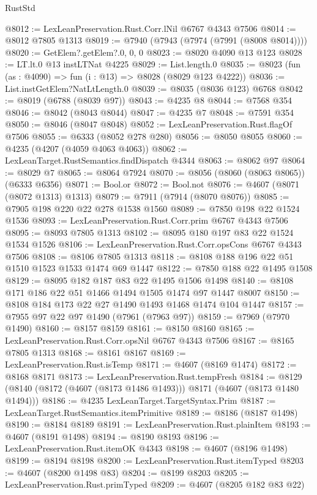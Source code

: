 \begin{lexlean}{RustStd}
\begin{coremodule}
@8012 := LexLeanPreservation.Rust.Corr.lNil @6767 @4343 @7506
@8014 := @8012 @7805 @1313
@8019 := @7940 (@7943 (@7974 (@7991 (@8008 @8014))))
@8020 := GetElem?.getElem?.{0, 0, 0}
@8023 := @8020 @4090 @13 @123
@8028 := LT.lt.{0} @13 instLTNat @4225
@8029 := List.length.{0}
@8035 := @8023 (fun (as : @4090) => fun (i : @13) => @8028 (@8029 @123 @4222))
@8036 := List.instGetElem?NatLtLength.{0}
@8039 := @8035 (@8036 @123) @6768
@8042 := @8019 (@6788 (@8039 @97))
@8043 := @4235 @8
@8044 := @7568 @354
@8046 := @8042 (@8043 @8044)
@8047 := @4235 @7
@8048 := @7591 @354
@8050 := @8046 (@8047 @8048)
@8052 := LexLeanPreservation.Rust.flagOf @7506
@8055 := @6333 (@8052 @278 @280)
@8056 := @8050 @8055
@8060 := @4235 (@4207 (@4059 @4063 @4063))
@8062 := LexLeanTarget.RustSemantics.findDispatch @4344
@8063 := @8062 @97
@8064 := @8029 @7
@8065 := @8064 @7924
@8070 := @8056 (@8060 (@8063 @8065)) (@6333 @6356)
@8071 := Bool.or
@8072 := Bool.not
@8076 := @4607 (@8071 (@8072 @1313) @1313)
@8079 := @7911 (@7914 (@8070 @8076))
@8085 := @7905 @198 @220 @22 @278 @1538 @1560
@8089 := @7850 @198 @22 @1524 @1536
@8093 := LexLeanPreservation.Rust.Corr.prim @6767 @4343 @7506
@8095 := @8093 @7805 @1313
@8102 := @8095 @180 @197 @83 @22 @1524 @1534 @1526
@8106 := LexLeanPreservation.Rust.Corr.opsCons @6767 @4343 @7506
@8108 := @8106 @7805 @1313
@8118 := @8108 @188 @196 @22 @51 @1510 @1523 @1533 @1474 @69 @1447
@8122 := @7850 @188 @22 @1495 @1508
@8129 := @8095 @182 @187 @83 @22 @1495 @1506 @1498
@8140 := @8108 @171 @186 @22 @51 @1466 @1494 @1505 @1474 @97 @1447 @8007
@8150 := @8108 @184 @173 @22 @27 @1490 @1493 @1468 @1474 @104 @1447
@8157 := @7955 @97 @22 @97 @1490 (@7961 (@7963 @97))
@8159 := @7969 (@7970 @1490)
@8160 := @8157 @8159
@8161 := @8150 @8160
@8165 := LexLeanPreservation.Rust.Corr.opsNil @6767 @4343 @7506
@8167 := @8165 @7805 @1313
@8168 := @8161 @8167
@8169 := LexLeanPreservation.Rust.isTemp
@8171 := @4607 (@8169 @1474)
@8172 := @8168 @8171
@8173 := LexLeanPreservation.Rust.tempFresh
@8184 := @8129 (@8140 (@8172 (@4607 (@8173 @1486 @1493))) @8171 (@4607 (@8173 @1480 @1494)))
@8186 := @4235 LexLeanTarget.TargetSyntax.Prim
@8187 := LexLeanTarget.RustSemantics.itemPrimitive
@8189 := @8186 (@8187 @1498)
@8190 := @8184 @8189
@8191 := LexLeanPreservation.Rust.plainItem
@8193 := @4607 (@8191 @1498)
@8194 := @8190 @8193
@8196 := LexLeanPreservation.Rust.itemOK @4343
@8198 := @4607 (@8196 @1498)
@8199 := @8194 @8198
@8200 := LexLeanPreservation.Rust.itemTyped
@8203 := @4607 (@8200 @1498 @83)
@8204 := @8199 @8203
@8205 := LexLeanPreservation.Rust.primTyped
@8209 := @4607 (@8205 @182 @83 @22)

\end{coremodule}
\end{lexlean}
